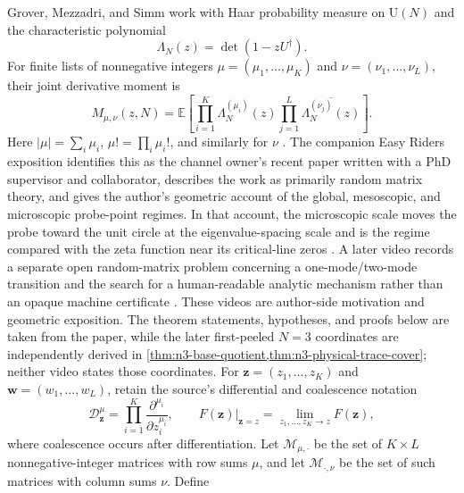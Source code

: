 Grover, Mezzadri, and Simm work with Haar probability measure on $\mathrm U(N)$ and the
characteristic polynomial
\begin{equation}
 \Lambda_N(z)=\det(1-zU^\dagger).
\end{equation}
For finite lists of nonnegative integers
$\mu=(\mu_1,\ldots,\mu_K)$ and $\nu=(\nu_1,\ldots,\nu_L)$, their joint derivative moment is
\begin{equation}
 M_{\mu,\nu}(z,N)
 =\mathbb E\!\left[
   \prod_{i=1}^{K}\Lambda_N^{(\mu_i)}(z)
   \prod_{j=1}^{L}\overline{\Lambda_N^{(\nu_j)}(z)}
 \right].
 \label{eq:GMS-moment-definition}
\end{equation}
Here $|\mu|=\sum_i\mu_i$, $\mu!=\prod_i\mu_i!$, and similarly for $\nu$
\cite[eq.~(1.1)]{groverMezzadriSimm2026}.
The companion Easy Riders exposition identifies this as the channel owner's recent paper
written with a PhD supervisor and collaborator, describes the work as primarily random
matrix theory, and gives the author's geometric account of the global, mesoscopic, and
microscopic probe-point regimes.  In that account, the microscopic scale moves the probe
toward the unit circle at the eigenvalue-spacing scale and is the regime compared with the
zeta function near its critical-line zeros
\cite[0:25--0:35, 3:03--3:08, and 7:44--10:52]{easyRiders2026CUE}.
A later video records a separate open random-matrix problem concerning a one-mode/two-mode
transition and the search for a human-readable analytic mechanism rather than an opaque
machine certificate \cite[3:19--6:15 and 7:20--12:08]{easyRiders2026SevenDays}.
These videos are author-side motivation and geometric exposition.  The theorem statements,
hypotheses, and proofs below are taken from the paper, while the later first-peeled
$N=3$ coordinates are independently derived in
\cref{thm:n3-base-quotient,thm:n3-physical-trace-cover}; neither video states those
coordinates.
For $\boldsymbol z=(z_1,\ldots,z_K)$ and $\boldsymbol w=(w_1,\ldots,w_L)$, retain the
source's differential and coalescence notation
\begin{equation}
 \mathcal D_{\boldsymbol z}^{\mu}
 =\prod_{i=1}^{K}\frac{\partial^{\mu_i}}{\partial z_i^{\mu_i}},
 \qquad
 \left.F(\boldsymbol z)\right|_{\boldsymbol z=z}
 =\lim_{z_1,\ldots,z_K\to z}F(\boldsymbol z),
 \label{eq:GMS-differential-coalescence}
\end{equation}
where coalescence occurs after differentiation.  Let $\mathcal M_{\mu,\cdot}$ be the set of
$K\times L$ nonnegative-integer matrices with row sums $\mu$, and let
$\mathcal M_{\cdot,\nu}$ be the set of such matrices with column sums $\nu$.  Define
